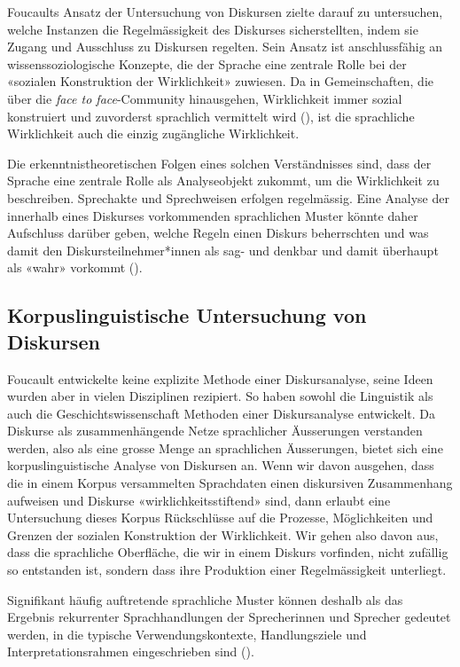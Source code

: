Foucaults Ansatz der Untersuchung von Diskursen zielte darauf zu untersuchen, welche Instanzen die Regelmässigkeit des Diskurses sicherstellten, indem sie Zugang und Ausschluss zu Diskursen regelten. Sein Ansatz ist anschlussfähig an wissenssoziologische Konzepte, die der Sprache eine zentrale Rolle bei der «sozialen Konstruktion der Wirklichkeit» zuwiesen. Da in Gemeinschaften, die über die \textit{face to face}-Community hinausgehen, Wirklichkeit immer sozial konstruiert und zuvorderst sprachlich vermittelt wird (\cite{berger_gesellschaftliche_2018}), ist die sprachliche Wirklichkeit auch die einzig zugängliche Wirklichkeit.

Die erkenntnistheoretischen Folgen eines solchen Verständnisses sind, dass der Sprache eine zentrale Rolle als Analyseobjekt zukommt, um die Wirklichkeit zu beschreiben. Sprechakte und Sprechweisen erfolgen regelmässig. Eine Analyse der innerhalb eines Diskurses vorkommenden sprachlichen Muster könnte daher Aufschluss darüber geben, welche Regeln einen Diskurs beherrschten und was damit den Diskursteilnehmer*innen als sag- und denkbar und damit überhaupt als «wahr» vorkommt (\cite[32]{bubenhofer_sprachgebrauchsmuster_2009}).

\subsection{Korpuslinguistische Untersuchung von Diskursen}

Foucault entwickelte keine explizite Methode einer Diskursanalyse, seine Ideen wurden aber in vielen Disziplinen rezipiert. So haben sowohl die Linguistik als auch die Geschichtswissenschaft Methoden einer Diskursanalyse entwickelt. Da Diskurse als zusammenhängende Netze sprachlicher Äusserungen verstanden werden, also als eine grosse Menge an sprachlichen Äusserungen, bietet sich eine korpuslinguistische Analyse von Diskursen an. Wenn wir davon ausgehen, dass die in einem Korpus versammelten Sprachdaten einen diskursiven Zusammenhang aufweisen und Diskurse «wirklichkeitsstiftend» sind, dann erlaubt eine Untersuchung dieses Korpus Rückschlüsse auf die Prozesse, Möglichkeiten und Grenzen der sozialen Konstruktion der Wirklichkeit. Wir gehen also davon aus, dass die sprachliche Oberfläche, die wir in einem Diskurs vorfinden, nicht zufällig so entstanden ist, sondern dass ihre Produktion einer Regelmässigkeit unterliegt.

\begin{displayquote}
    Signifikant häufig auftretende sprachliche Muster können deshalb als das Ergebnis rekurrenter Sprachhandlungen der Sprecherinnen und Sprecher gedeutet werden, in die typische Verwendungskontexte, Handlungsziele und Interpretationsrahmen eingeschrieben sind (\cite[63]{kupietz_korpuslinguistik_2018}).
\end{displayquote}

